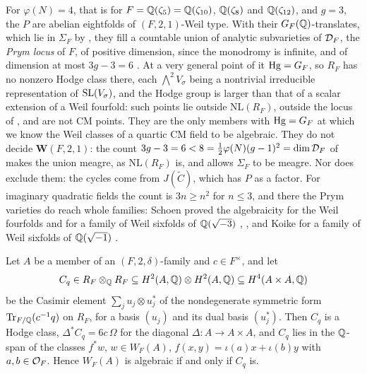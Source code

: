 \begin{remark}
For $\varphi(N)=4$, that is for $F=\mathbb{Q}(\zeta_{5})=\mathbb{Q}(\zeta_{10})$,
$\mathbb{Q}(\zeta_{8})$ and $\mathbb{Q}(\zeta_{12})$, and $g=3$, the $P$ are abelian
eightfolds of $(F,2,1)$-Weil type. With their $G_{F}(\mathbb{Q})$-translates, which
lie in $\Sigma_{F}$ by \cite[Theorem~17.7(ii)]{paperI}, they fill a countable
union of analytic subvarieties of $\mathcal{D}_{F}$, the \emph{Prym locus} of $F$, of
positive dimension, since the monodromy is infinite, and of dimension at most
$3g-3=6$ \cite[pp.~25--26]{Sch88}. At a very general point of it $\operatorname{Hg}=G_{F}$, so
$R_{F}$ has no nonzero Hodge class there, each $\bigwedge^{2}V_{\sigma}$ being
a nontrivial irreducible representation of $\operatorname{SL}(V_{\sigma})$, and the Hodge
group is larger than that of a scalar extension of a Weil fourfold: such
points lie outside $\mathrm{NL}(R_{F})$, outside the locus of
, and are not CM points. They are the only members
with $\operatorname{Hg}=G_{F}$ at which we know the Weil classes of a quartic CM field to be
algebraic. They do not decide $\mathbf{W}(F,2,1)$: the count
$3g-3=6<8=\tfrac12\varphi(N)(g-1)^{2}=\dim\mathcal{D}_{F}$ of \cite[pp.~25--26]{Sch88}
makes the union meagre, as $\mathrm{NL}(R_{F})$ is, and
\cite[Theorem~17.7(iii)]{paperI} allows $\Sigma_{F}$ to be meagre. Nor does
 exclude them: the cycles come from $J(\widetilde C)$,
which has $P$ as a factor. For imaginary quadratic fields the count is
$3n\ge n^{2}$ for $n\le3$, and there the Prym varieties do reach whole
families: Schoen proved the algebraicity for the Weil fourfolds and for a
family of Weil sixfolds of $\mathbb{Q}(\sqrt{-3})$ \cite[Theorem~3.2]{Sch88},
\cite{Sch98}, and Koike for a family of Weil sixfolds of $\mathbb{Q}(\sqrt{-1})$
\cite[Theorem~2.1, Corollary~2.1]{Koi04}.
\end{remark}

\begin{proposition}\label{prop:quarticcasimir}
Let $A$ be a member of an $(F,2,\delta)$-family and $c\in F^{\times}$, and let
\[
  C_{q}\in R_{F}\otimes_{\mathbb{Q}}R_{F}\subseteq H^{2}(A,\mathbb{Q})\otimes H^{2}(A,\mathbb{Q})
  \subseteq H^{4}(A\times A,\mathbb{Q})
\]
be the Casimir element $\sum_{j}u_{j}\otimes u_{j}^{*}$ of the nondegenerate
symmetric form $\operatorname{Tr}_{F/\mathbb{Q}}(c^{-1}q)$ on $R_{F}$, for a basis $(u_{j})$ and its
dual basis $(u_{j}^{*})$. Then $C_{q}$ is a Hodge class,
$\Delta^{*}C_{q}=6c\,\Omega$ for the diagonal $\Delta\colon A\to A\times A$,
and $C_{q}$ lies in the $\mathbb{Q}$-span of the classes $f^{*}w$, $w\in W_{F}(A)$,
$f(x,y)=\iota(a)x+\iota(b)y$ with $a,b\in\mathcal{O}_{F}$. Hence $W_{F}(A)$ is
algebraic if and only if $C_{q}$ is.
\end{proposition}


